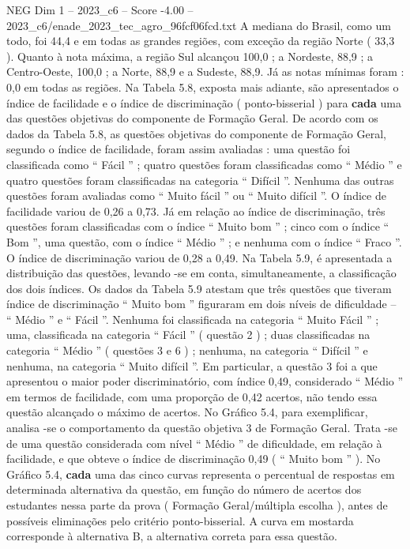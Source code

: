 \begin{textsample}{NEG Dim 1 – 2023\_c6 – Score -4.00 – 2023\_c6/enade\_2023\_tec\_agro\_96fcf06fcd.txt}
A mediana do Brasil, como um todo, foi 44,4 e em todas as grandes regiões, com exceção da região Norte ( 33,3 ).
Quanto à nota máxima, a região Sul alcançou 100,0 ; a Nordeste, 88,9 ; a Centro-Oeste, 100,0 ; a Norte, 88,9 e a Sudeste, 88,9.
Já as notas mínimas foram : 0,0 em todas as regiões.
Na Tabela 5.8, exposta mais adiante, são apresentados o índice de facilidade e o índice de discriminação ( ponto-bisserial ) para \textbf{cada} uma das questões objetivas do componente de Formação Geral.
De acordo com os dados da Tabela 5.8, as questões objetivas do componente de Formação Geral, segundo o índice de facilidade, foram assim avaliadas : uma questão foi classificada como “ Fácil ” ; quatro questões foram classificadas como “ Médio ” e quatro questões foram classificadas na categoria “ Difícil ”.
Nenhuma das outras questões foram avaliadas como “ Muito fácil ” ou “ Muito difícil ”.
O índice de facilidade variou de 0,26 a 0,73.
Já em relação ao índice de discriminação, três questões foram classificadas com o índice “ Muito bom ” ; cinco com o índice “ Bom ”, uma questão, com o índice “ Médio ” ; e nenhuma com o índice “ Fraco ”.
O índice de discriminação variou de 0,28 a 0,49.
Na Tabela 5.9, é apresentada a distribuição das questões, levando -se em conta, simultaneamente, a classificação dos dois índices.
Os dados da Tabela 5.9 atestam que três questões que tiveram índice de discriminação “ Muito bom ” figuraram em dois níveis de dificuldade – “ Médio ” e “ Fácil ”.
Nenhuma foi classificada na categoria “ Muito Fácil ” ; uma, classificada na categoria “ Fácil ” ( questão 2 ) ; duas classificadas na categoria “ Médio ” ( questões 3 e 6 ) ; nenhuma, na categoria “ Difícil ” e nenhuma, na categoria “ Muito difícil ”.
Em particular, a questão 3 foi a que apresentou o maior poder discriminatório, com índice 0,49, considerado “ Médio ” em termos de facilidade, com uma proporção de 0,42 acertos, não tendo essa questão alcançado o máximo de acertos.
No Gráfico 5.4, para exemplificar, analisa -se o comportamento da questão objetiva 3 de Formação Geral.
Trata -se de uma questão considerada com nível “ Médio ” de dificuldade, em relação à facilidade, e que obteve o índice de discriminação 0,49 ( “ Muito bom ” ).
No Gráfico 5.4, \textbf{cada} uma das cinco curvas representa o percentual de respostas em determinada alternativa da questão, em função do número de acertos dos estudantes nessa parte da prova ( Formação Geral/múltipla escolha ), antes de possíveis eliminações pelo critério ponto-bisserial.
A curva em mostarda corresponde à alternativa B, a alternativa correta para essa questão.

\end{textsample}
